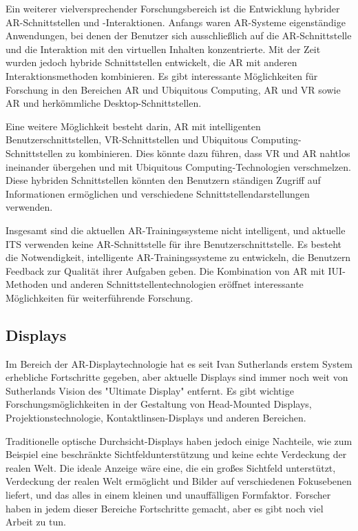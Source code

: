 Ein weiterer vielversprechender Forschungsbereich ist die Entwicklung hybrider
AR-Schnittstellen und -Interaktionen. Anfangs waren AR-Systeme eigenständige
Anwendungen, bei denen der Benutzer sich ausschließlich auf die
AR-Schnittstelle und die Interaktion mit den virtuellen Inhalten konzentrierte.
Mit der Zeit wurden jedoch hybride Schnittstellen entwickelt, die AR mit
anderen Interaktionsmethoden kombinieren. Es gibt interessante Möglichkeiten
für Forschung in den Bereichen AR und Ubiquitous Computing, AR und VR sowie AR
und herkömmliche Desktop-Schnittstellen.

Eine weitere Möglichkeit besteht darin, AR mit intelligenten
Benutzerschnittstellen, VR-Schnittstellen und Ubiquitous
Computing-Schnittstellen zu kombinieren. Dies könnte dazu führen, dass VR und
AR nahtlos ineinander übergehen und mit Ubiquitous Computing-Technologien
verschmelzen. Diese hybriden Schnittstellen könnten den Benutzern ständigen
Zugriff auf Informationen ermöglichen und verschiedene
Schnittstellendarstellungen verwenden.

Insgesamt sind die aktuellen AR-Trainingssysteme nicht intelligent, und
aktuelle ITS verwenden keine AR-Schnittstelle für ihre Benutzerschnittstelle.
Es besteht die Notwendigkeit, intelligente AR-Trainingssysteme zu entwickeln,
die Benutzern Feedback zur Qualität ihrer Aufgaben geben. Die Kombination von
AR mit IUI-Methoden und anderen Schnittstellentechnologien eröffnet
interessante Möglichkeiten für weiterführende Forschung.
\subsection{Displays}
Im Bereich der AR-Displaytechnologie hat es seit Ivan Sutherlands erstem System
erhebliche Fortschritte gegeben, aber aktuelle Displays sind immer noch weit
von Sutherlands Vision des "Ultimate Display" entfernt. Es gibt wichtige
Forschungsmöglichkeiten in der Gestaltung von Head-Mounted Displays,
Projektionstechnologie, Kontaktlinsen-Displays und anderen Bereichen.

Traditionelle optische Durchsicht-Displays haben jedoch einige Nachteile, wie
zum Beispiel eine beschränkte Sichtfeldunterstützung und keine echte Verdeckung
der realen Welt. Die ideale Anzeige wäre eine, die ein großes Sichtfeld
unterstützt, Verdeckung der realen Welt ermöglicht und Bilder auf verschiedenen
Fokusebenen liefert, und das alles in einem kleinen und unauffälligen
Formfaktor. Forscher haben in jedem dieser Bereiche Fortschritte gemacht, aber
es gibt noch viel Arbeit zu tun.

